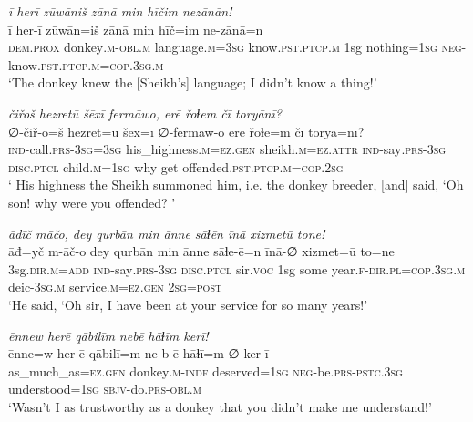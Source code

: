 \ea \label{HB.71}
\textit{ī herī zūwāniš zānā min hīčim nezānān!} \\ 
\gll ī her-ī zūwān=iš zānā min hīč=im ne-zānā=n \\ 
 \textsc{dem.prox} donkey\textsc{.m}\textsc{-obl}\textsc{.m} language\textsc{.m}\textsc{=3sg} know\textsc{.pst}\textsc{.ptcp}\textsc{.m} 1sg nothing\textsc{=1sg} \textsc{neg-}know\textsc{.pst}\textsc{.ptcp}\textsc{.m}\textsc{=cop}\textsc{.3sg}\textsc{.m} \\ 
\glt `The donkey knew the [Sheikh’s] language; I didn’t know a thing!'
\z 
 
\ea \label{HB.80}
\textit{čiřoš hezretū šēxī fermāwo, erē řoɫem čī toryānī?} \\ 
\gll ∅-čiř-o=š hezret=ū šēx=ī ∅-fermāw-o erē řoɫe=m čī toryā=nī? \\ 
 \textsc{ind-}call\textsc{.prs}\textsc{-3sg}\textsc{=3sg} his\_highness\textsc{.m}\textsc{=ez}\textsc{.gen} sheikh\textsc{.m}\textsc{=ez}.\textsc{attr} \textsc{ind-}say\textsc{.prs}\textsc{-3sg} \textsc{disc.ptcl} child\textsc{.m}\textsc{=1sg} why get offended\textsc{.pst}\textsc{.ptcp}\textsc{.m}\textsc{=cop}\textsc{.\textsc{2sg}} \\ 
\glt ` His highness the Sheikh summoned him, i.e. the donkey breeder, [and] said, ‘Oh son! why were you offended? '
\z 
 
\ea \label{HB.82}
\textit{āđīč māčo, dey qurbān min ānne sāɫēn īnā xizmetū tone!} \\ 
\gll āđ=yč m-āč-o dey qurbān min ānne sāɫe-ē=n īnā-∅ xizmet=ū to=ne \\ 
 3sg\textsc{.dir}\textsc{.m}\textsc{=add} \textsc{ind-}say\textsc{.prs}\textsc{-3sg} \textsc{disc.ptcl} sir.\textsc{voc} 1sg some year\textsc{\textsc{.f}}\textsc{-dir}\textsc{.pl}\textsc{=cop}\textsc{.3sg}\textsc{.m} deic\textsc{-3sg}\textsc{.m} service\textsc{.m}\textsc{=ez}\textsc{.gen} \textsc{2sg}\textsc{=\textsc{post}} \\ 
\glt `He said, ‘Oh sir, I have been at your service for so many years!'
\z 
 
\ea \label{HB.83}
\textit{ēnnew herē qābilīm nebē hāɫīm kerī!} \\ 
\gll ēnne=w her-ē qābilī=m ne-b-ē hāɫī=m ∅-ker-ī \\ 
 as\_much\_as\textsc{=ez}\textsc{.gen} donkey\textsc{.m}\textsc{-indf} deserved\textsc{=1sg} \textsc{neg-}be\textsc{.prs}\textsc{-pstc}\textsc{.3sg} understood\textsc{=1sg} \textsc{sbjv-}do\textsc{.prs}\textsc{-obl}\textsc{.m} \\ 
\glt `Wasn’t I as trustworthy as a donkey that you didn’t make me understand!'
\z 
 
